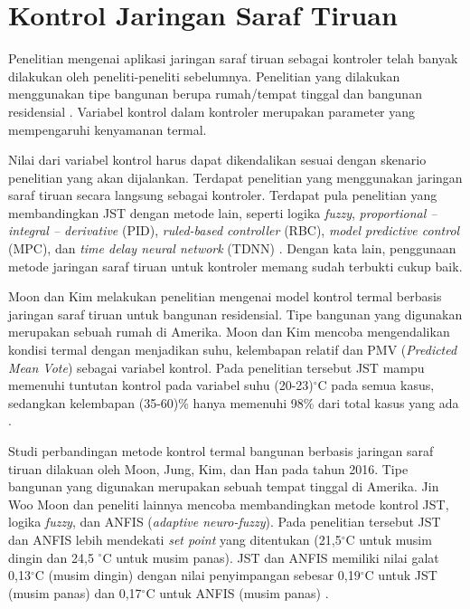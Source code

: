 \section{Kontrol Jaringan Saraf Tiruan}

Penelitian mengenai aplikasi jaringan saraf tiruan sebagai kontroler telah banyak dilakukan oleh peneliti-peneliti sebelumnya. Penelitian yang dilakukan menggunakan tipe bangunan berupa rumah/tempat tinggal \cite{paper22JJkim, paper22SKJung} dan bangunan residensial \cite{paper22JanDrgona}. Variabel kontrol dalam kontroler merupakan parameter yang mempengaruhi kenyamanan termal.

Nilai dari variabel kontrol harus dapat dikendalikan sesuai dengan skenario penelitian yang akan dijalankan. Terdapat penelitian yang menggunakan jaringan saraf tiruan secara langsung sebagai kontroler. Terdapat pula penelitian yang membandingkan JST dengan metode lain, seperti logika \textit{fuzzy}, \textit{proportional – integral – derivative} (PID), \textit{ruled-based controller} (RBC), \textit{model predictive control} (MPC), dan \textit{time delay neural network} (TDNN) \cite{paper22JanDrgona}. Dengan kata lain, penggunaan metode jaringan saraf tiruan untuk kontroler memang sudah terbukti cukup baik.

Moon dan Kim melakukan penelitian mengenai model kontrol termal berbasis jaringan saraf tiruan untuk bangunan residensial. Tipe bangunan yang digunakan merupakan sebuah rumah di Amerika. Moon dan Kim mencoba mengendalikan kondisi termal dengan menjadikan suhu, kelembapan relatif dan PMV (\textit{Predicted Mean Vote}) sebagai variabel kontrol. Pada penelitian tersebut JST mampu memenuhi tuntutan kontrol pada variabel suhu (20-23)$^\circ$C pada semua kasus, sedangkan kelembapan (35-60)\% hanya memenuhi 98\% dari total kasus yang ada \cite{paper22JJkim}.

Studi perbandingan metode kontrol termal bangunan berbasis jaringan saraf tiruan dilakuan oleh Moon, Jung, Kim, dan Han pada tahun 2016. Tipe bangunan yang digunakan merupakan sebuah tempat tinggal di Amerika. Jin Woo Moon dan peneliti lainnya mencoba membandingkan metode kontrol JST, logika \textit{fuzzy}, dan ANFIS (\textit{adaptive neuro-fuzzy}). Pada penelitian tersebut JST dan ANFIS lebih mendekati \textit{set point} yang ditentukan (21,5$^{\circ}$C untuk musim dingin dan 24,5 $^{\circ}$C untuk musim panas). JST dan ANFIS memiliki nilai galat 0,13$^{\circ}$C (musim dingin) dengan nilai penyimpangan sebesar 0,19$^{\circ}$C untuk JST (musim panas) dan 0,17$^{\circ}$C untuk ANFIS (musim panas) \cite{paper22SKJung}.

